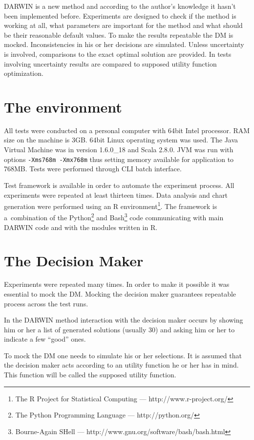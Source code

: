 DARWIN is a new method and according to the author's knowledge it hasn't been
implemented before. Experiments are designed to check if the method is working
at all, what parameters are important for the method and what should be their
reasonable default values. To make the results repeatable the DM is
mocked. Inconsistencies in his or her decisions are simulated. Unless
uncertainty is involved, comparisons to the exact optimal solution are
provided. In tests involving uncertainty results are compared to supposed
utility function optimization.

\section{The environment}

All tests were conducted on a personal computer with 64bit Intel
processor. RAM size on the machine is 3GB. 64bit Linux operating system was
used. The Java Virtual Machine was in version 1.6.0\_18 and Scala 2.8.0. JVM
was run with options \texttt{-Xms768m -Xmx768m} thus setting memory available
for application to 768MB. Tests were performed through CLI batch interface.

Test framework is available in order to automate the experiment process. All
experiments were repeated at least thirteen times. Data analysis and chart
generation were performed using an R environment\footnote{The R Project for
  Statistical Computing --- http://www.r-project.org/}. The framework is
a~combination of the Python\footnote{The Python Programming Language ---
  http://python.org/} and Bash\footnote{Bourne-Again SHell ---
  http://www.gnu.org/software/bash/bash.html} code communicating with main
DARWIN code and with the modules written in R.

\section{The Decision Maker}

Experiments were repeated many times. In order to make it possible it was
essential to mock the DM. Mocking the decision maker guarantees repeatable
process across the test runs.

In the DARWIN method interaction with the decision maker occurs by showing him
or her a list of generated solutions (usually 30) and asking him or her to
indicate a few ``good'' ones.

To mock the DM one needs to simulate his or her selections. It is assumed that
the decision maker acts according to an utility function he or her has in
mind. This function will be called the supposed utility function.

